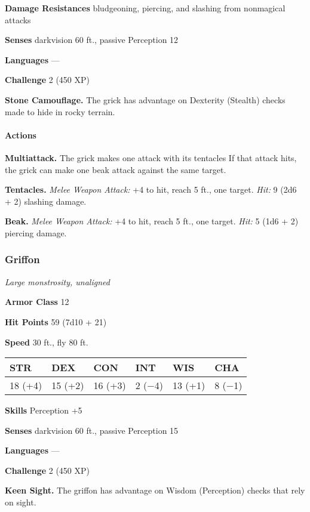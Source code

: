 \documentclass[
]{article}
\begin{document}
\textbf{Damage Resistances} bludgeoning, piercing, and slashing from
nonmagical attacks

\textbf{Senses} darkvision 60 ft., passive Perception 12

\textbf{Languages} ---

\textbf{Challenge} 2 (450 XP)

\textbf{Stone Camouflage.} The grick has advantage on Dexterity
(Stealth) checks made to hide in rocky terrain.

\hypertarget{actions-21}{%
\paragraph{Actions}\label{actions-21}}

\textbf{Multiattack.} The grick makes one attack with its tentacles If
that attack hits, the grick can make one beak attack against the same
target.

\textbf{Tentacles.} \emph{Melee Weapon Attack:} +4 to hit, reach 5 ft.,
one target. \emph{Hit:} 9 (2d6 + 2) slashing damage.

\textbf{Beak.} \emph{Melee Weapon Attack:} +4 to hit, reach 5 ft., one
target. \emph{Hit:} 5 (1d6 + 2) piercing damage.

\hypertarget{griffon}{%
\subsubsection{Griffon}\label{griffon}}

\emph{Large monstrosity, unaligned}

\textbf{Armor Class} 12

\textbf{Hit Points} 59 (7d10 + 21)

\textbf{Speed} 30 ft., fly 80 ft.

\begin{longtable}[]{@{}llllll@{}}
\toprule
STR & DEX & CON & INT & WIS & CHA\tabularnewline
\midrule
\endhead
18 (+4) & 15 (+2) & 16 (+3) & 2 (−4) & 13 (+1) & 8 (−1)\tabularnewline
\bottomrule
\end{longtable}

\textbf{Skills} Perception +5

\textbf{Senses} darkvision 60 ft., passive Perception 15

\textbf{Languages} ---

\textbf{Challenge} 2 (450 XP)

\textbf{Keen Sight.} The griffon has advantage on Wisdom (Perception)
checks that rely on sight.
\end{document}
